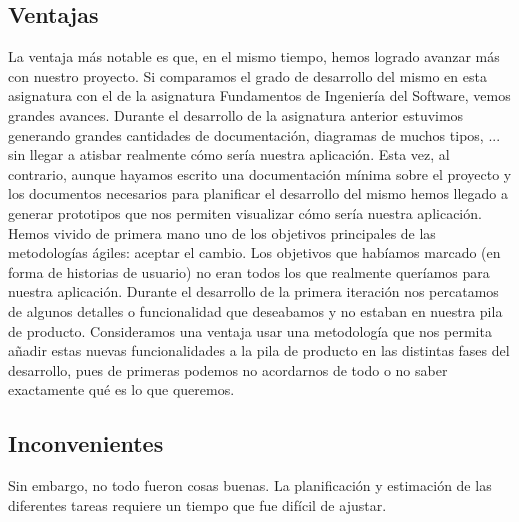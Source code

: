 \documentclass[11pt]{article}
\begin{document}
\subsection*{Ventajas}
La ventaja más notable es que, en el mismo tiempo, hemos logrado avanzar más con nuestro proyecto. Si comparamos el grado de desarrollo del mismo en esta asignatura con el de la asignatura Fundamentos de Ingeniería del Software, vemos grandes avances. Durante el desarrollo de la asignatura anterior estuvimos generando grandes cantidades de documentación, diagramas de muchos tipos, ... sin llegar a atisbar realmente cómo sería nuestra aplicación. Esta vez, al contrario, aunque hayamos escrito una documentación mínima sobre el proyecto y los documentos necesarios para planificar el desarrollo del mismo hemos llegado a generar prototipos que nos permiten visualizar cómo sería nuestra aplicación.\\

Hemos vivido de primera mano uno de los objetivos principales de las metodologías ágiles: aceptar el cambio. Los objetivos que habíamos marcado (en forma de historias de usuario) no eran todos los que realmente queríamos para nuestra aplicación. Durante el desarrollo de la primera iteración nos percatamos de algunos detalles o funcionalidad que deseabamos y no estaban en nuestra pila de producto. Consideramos una ventaja usar una metodología que nos permita añadir estas nuevas funcionalidades a la pila de producto en las distintas fases del desarrollo, pues de primeras podemos no acordarnos de todo o no saber exactamente qué es lo que queremos.\\

\subsection*{Inconvenientes}

Sin embargo, no todo fueron cosas buenas. La planificación y estimación de las diferentes tareas requiere un tiempo que fue difícil de ajustar. 
\end{document}
